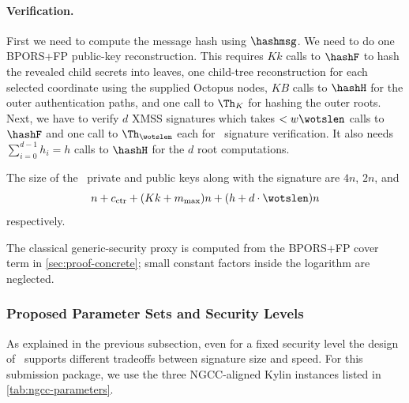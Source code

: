 \paragraph{Verification.}
First we need to compute the message hash using $\hashmsg$. We need to do one
BPORS+FP public-key reconstruction.  This requires $Kk$ calls to $\hashF$ to
hash the revealed child secrets into leaves, one child-tree reconstruction for
each selected coordinate using the supplied Octopus nodes, $KB$ calls to
$\hashH$ for the outer authentication paths, and one call to $\Th_K$ for
hashing the outer roots. Next, we have to verify $d$ XMSS signatures which
takes $< w \wotslen$ calls to $\hashF$ and one call to $\Th_{\wotslen}$ each
for \WOTSCS\ signature verification\footnotemark. It also needs
$\sum_{i=0}^{d-1} h_i = h$ calls to $\hashH$ for the $d$ root computations.


The size of the \SPHINCSA\ private and public keys along with the signature are
$4n$, $2n$, and
\[
    n+c_{\mathrm{ctr}}+(Kk+m_{\max})n+(h+d\cdot\wotslen)n
\]
respectively.

The classical generic-security proxy is computed from the BPORS+FP cover term
in \cref{sec:proof-concrete}; small constant factors inside the logarithm are
neglected.



\subsubsection{Proposed Parameter Sets and Security Levels}

As explained in the previous subsection, even for a fixed security level the design of \SPHINCSA\ supports different tradeoffs between signature size and speed. For this submission package, we use the three NGCC-aligned Kylin instances listed in \cref{tab:ngcc-parameters}.

